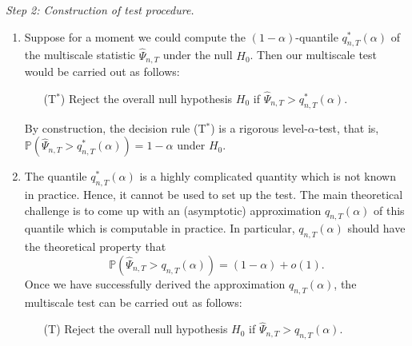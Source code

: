 \documentclass[a4paper,12pt]{article}
\begin{document}
\noindent \textit{Step 2: Construction of test procedure.}
\begin{enumerate}[label=(\roman*),leftmargin=0.75cm]

\item Suppose for a moment we could compute the $(1-\alpha)$-quantile $q_{n,T}^*(\alpha)$ of the multiscale statistic $\hat{\Psi}_{n,T}$ under the null $H_0$. Then our multiscale test would be carried out as follows: 
\begin{itemize}[leftmargin=1cm]

\item[(T$^*$)] Reject the overall null hypothesis $H_0$ if $\hat{\Psi}_{n,T} > q_{n,T}^*(\alpha)$. 
\end{itemize}
By construction, the decision rule (T$^*$) is a rigorous level-$\alpha$-test, that is, $\mathbb{P}(\hat{\Psi}_{n,T} > q_{n,T}^*(\alpha)) = 1-\alpha$ under $H_0$. 
\item The quantile $q_{n,T}^*(\alpha)$ is a highly complicated quantity which is not known in practice. Hence, it cannot be used to set up the test. The main theoretical challenge is to come up with an (asymptotic) approximation $q_{n,T}(\alpha)$ of this quantile which is computable in practice. In particular, $q_{n,T}(\alpha)$ should have the theoretical property that 
\[ \mathbb{P} (\hat{\Psi}_{n,T} > q_{n,T}(\alpha)) = (1-\alpha) + o(1). \]
Once we have successfully derived the approximation $q_{n,T}(\alpha)$, the multiscale test can be carried out as follows: 
\begin{itemize}[leftmargin=0.8cm]
\item[(T)] Reject the overall null hypothesis $H_0$ if $\hat{\Psi}_{n,T} > q_{n,T}(\alpha)$. 
\end{itemize}


\end{enumerate}
\end{document}
